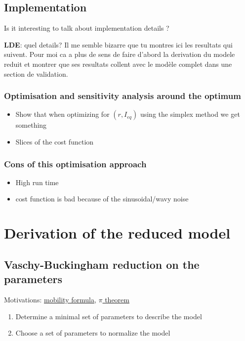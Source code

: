 \subsection{Implementation}
Is it interesting to talk about implementation details ?

\textbf{LDE}: quel details? Il me semble bizarre que tu montres ici les resultats qui suivent. Pour moi ca a plus de sens de faire d'abord la derivation du modele reduit et montrer que ses resultats collent avec le modèle complet dans une section de validation.

\subsubsection{Optimisation and sensitivity analysis around the optimum}
\begin{itemize}
 \item Show that when optimizing for $(r, I_{eq})$ using the simplex method we get something
 \item Slices of the cost function
\end{itemize}

\subsubsection{Cons of this optimisation approach}
\begin{itemize}
 \item High run time
 \item cost function is bad because of the sinusoidal/wavy noise
\end{itemize}

\section{Derivation of the reduced model}

\subsection{Vaschy-Buckingham reduction on the parameters}
Motivations: \href{https://en.wikipedia.org/wiki/Chebychev%E2%80%93Gr%C3%BCbler%E2%80%93Kutzbach_criterion}{mobility formula}, \href{https://en.wikipedia.org/wiki/Buckingham_%CF%80_theorem}{$\pi$ theorem}

\begin{enumerate}
 \item Determine a minimal set of parameters to describe the model
 \item Choose a set of parameters to normalize the model
\end{enumerate}

